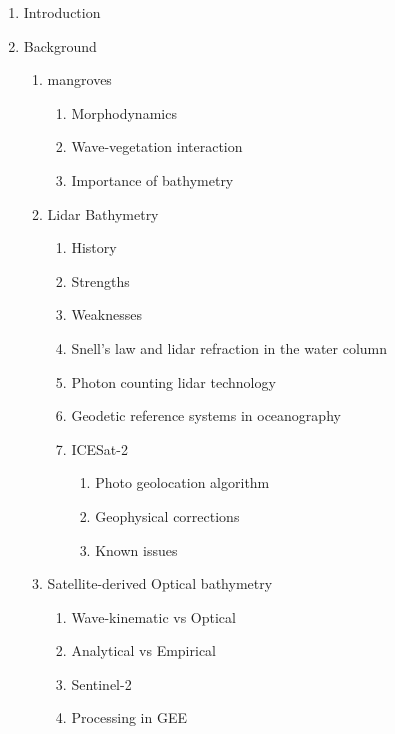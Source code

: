 \begin{enumerate}
      \item Introduction
      \item Background
      \begin{enumerate}
            \item mangroves
            \begin{enumerate}
                  \item Morphodynamics
                  \item Wave-vegetation interaction
                  \item Importance of bathymetry
            \end{enumerate}
            \item Lidar Bathymetry
            \begin{enumerate}
                  \item History
                  \item Strengths
                  \item Weaknesses
                  \item Snell's law and lidar refraction in the water column
                  \item Photon counting lidar technology
                  \item Geodetic reference systems in oceanography
                  \item ICESat-2
                \begin{enumerate}
                        \item Photo geolocation algorithm
                      \item Geophysical corrections
                      \item Known issues
                \end{enumerate}  
            \end{enumerate}
            \item Satellite-derived Optical bathymetry
            \begin{enumerate}
                  \item Wave-kinematic vs Optical
                  \item Analytical vs Empirical
                  \item Sentinel-2 
                  \item Processing in GEE
            \end{enumerate}
      \end{enumerate} 


\end{enumerate}
